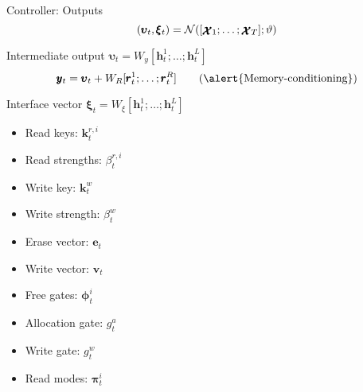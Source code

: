 \documentclass{beamer}
\newcommand{\xx}{\pmb{\raisebox{-1.5pt}{$\mathcal{X}$}}}
\newcommand{\hh}{\pmb{h}}
\begin{document}
\begin{frame}{Controller: Outputs}
	\[
	(\pmb{\upsilon}_t,\pmb{\xi}_t)=\mathcal{N}([\xx_1;\dots;\xx_T];\vartheta)
	\]
	\vspace{5pt}
	
	\pause
	\alert{Intermediate output} $\pmb{\upsilon}_t = W_y[\hh_t^1;\dots;\hh_t^L]$
	\[
	\pmb{y}_t = \pmb{\upsilon}_t + W_R[\pmb{r}_t^1;\dots;\pmb{r}_t^R] \tag{\alert{Memory-conditioning}}
	\]
	
	\pause
	\alert{Interface vector} $\pmb{\xi}_t = W_\xi[\hh_t^1;\dots;\hh_t^L]$
	
	\begin{minipage}{0.49\textwidth}
	\begin{itemize}
		\item Read keys: $\pmb{k}_t^{r,i}$ %
		\item Read strengths: $\beta_t^{r,i}$ %
		\item Write key: $\pmb{k}_t^w$ %
		\item Write strength: $\beta_t^{w}$ %
		\item Erase vector: $\pmb{e}_t$ %
	\end{itemize}
	\end{minipage}
	\begin{minipage}{0.49\textwidth}
	\begin{itemize}
		\item Write vector: $\pmb{v}_t$ %
		\item Free gates: $\pmb{\phi}_t^i$ %
		\item Allocation gate: $g_t^a$ %
		\item Write gate: $g_t^w$ %
		\item Read modes: $\pmb{\pi}_t^i$ %
	\end{itemize}
	\end{minipage}
\end{frame}
\end{document}
